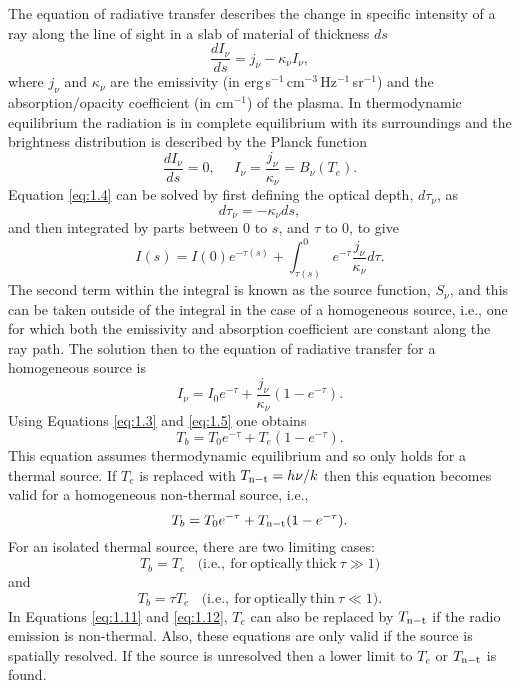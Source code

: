 The equation of radiative transfer describes the change in specific intensity of a ray along the line of sight in a slab of material of thickness $ds$
\begin{equation}\label{eq:1.4}
\frac{dI_{\nu}}{ds}=j_{\nu} - \kappa _{\nu}I_{\nu},
\end{equation}
where $j_{\nu}$ and $\kappa _{\nu}$ are the emissivity (in erg\,s$^{-1}$\,cm$^{-3}$\,Hz$^{-1}$\,sr$^{-1}$) and the absorption/opacity coefficient (in cm$^{-1}$) of the plasma. In thermodynamic equilibrium the radiation is in complete equilibrium with its surroundings and the brightness distribution is described by the Planck function
\begin{equation}\label{eq:1.5}
\dfrac{dI_{\nu}}{ds}=0, \ \ \ \ \ \ I_{\nu}= \frac{j_{\nu}}{\kappa _{\nu}}=B_{\nu}(T_e).
\end{equation}
Equation \ref{eq:1.4} can be solved by first defining the optical depth, $d\tau _{\nu}$, as
\begin{equation}
d\tau _{\nu}=-\kappa _{\nu}ds,
\end{equation}
and then integrated by parts between 0 to $s$, and $\tau$ to 0, to give 
\begin{equation}
I(s) = I(0)e^{-\tau(s)} + \int ^0 _{\tau (s)}e^{-\tau} \frac{j_{\nu}}{\kappa _{\nu}}d\tau.
\end{equation}
The second term within the integral is known as the source function, $S_{\nu}$, and this can be taken outside of the integral in the case of a homogeneous source, i.e., one for which both the emissivity and absorption coefficient are constant along the ray path. The solution then to the equation of radiative transfer for a homogeneous source is
\begin{equation}\label{eq:1.9}
I_{\nu} = I_{0}e^{-\tau} + \frac{j_{\nu}}{\kappa _{\nu}}(1 - e^{-\tau}).
\end{equation}
Using Equations \ref{eq:1.3} and \ref{eq:1.5} one obtains
\begin{equation}
T_{b} = T_{0}e^{-\tau} + T_{e}(1 - e^{-\tau}).
\end{equation}
This equation assumes thermodynamic equilibrium and so only holds for a thermal source. If $T_{e}$ is replaced with $T_{\rm{n-t}} = h\nu/k$  then this equation becomes valid for a homogeneous non-thermal source, i.e.,
\begin{equation}
T_{b} = T_{0}e^{-\tau} + T_{\rm{n-t}}(1 - e^{-\tau}).
\end{equation}
For an isolated thermal source, there are two limiting cases:
\begin{equation}\label{eq:1.11}
T_{b} = T_{e} \ \ \ \ \mathrm{(i.e.,\ for\ optically\ thick}\ \tau \gg 1)
\end{equation}
and
\begin{equation}\label{eq:1.12}
T_{b} = \tau T_{e} \ \ \ \ \mathrm{(i.e.,\ for\ optically\ thin}\ \tau \ll 1).
\end{equation}
In Equations \ref{eq:1.11} and \ref{eq:1.12}, $T_{e}$ can also be replaced by $T_{\rm{n-t}}$ if the radio emission is non-thermal. Also, these equations are only valid if the source is spatially resolved. If the source is unresolved then a lower limit to $T_{e}$ or $T_{\rm{n-t}}$ is found.

